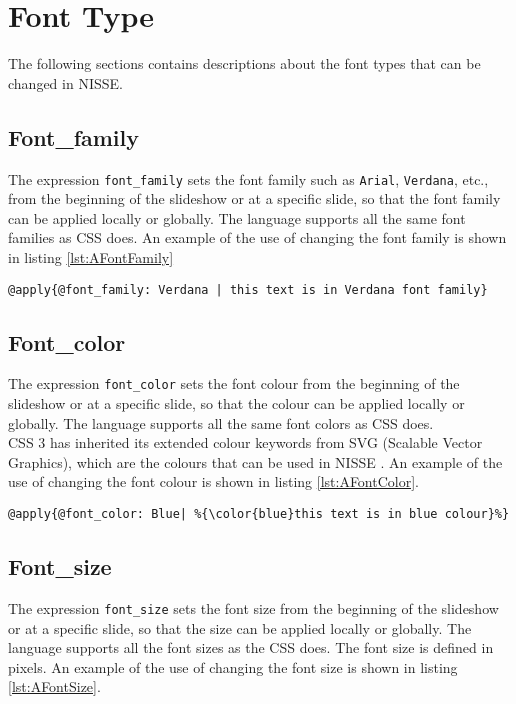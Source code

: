 \section{Font Type}
\label{AppendixFontType}
The following sections contains descriptions about the font types that can be changed in NISSE.

\subsection{Font\_family}
The expression \texttt{font\_family} sets the font family such as \texttt{Arial}, \texttt{Verdana}, etc., from the beginning of the slideshow or at a specific slide, so that the font family can be applied locally or globally. The language supports all the same font families as CSS does. An example of the use of changing the font family is shown in listing \ref{lst:AFontFamily}

\begin{lstlisting}[frame=single, caption=Changing font family, label=lst:AFontFamily ]
	@apply{@font_family: Verdana | this text is in Verdana font family}
\end{lstlisting}

\subsection{Font\_color}
The expression \texttt{font\_color} sets the font colour from the beginning of the slideshow or at a specific slide, so that the colour can be applied locally or globally. The language supports all the same font colors as CSS does. \\
CSS 3 has inherited its extended colour keywords from SVG (Scalable Vector Graphics), which are the colours that can be used in NISSE \cite{W3}. An example of the use of changing the font colour is shown in listing \ref{lst:AFontColor}.

\begin{lstlisting}[frame=single, caption=Changing font colour, label=lst:AFontColor]
	@apply{@font_color: Blue| %{\color{blue}this text is in blue colour}%}
\end{lstlisting}

\subsection{Font\_size}
The expression \texttt{font\_size} sets the font size from the beginning of the slideshow or at a specific slide, so that the size can be applied locally or globally. The language supports all the font sizes as the CSS does. The font size is defined in pixels. An example of the use of changing the font size is shown in listing \ref{lst:AFontSize}.

